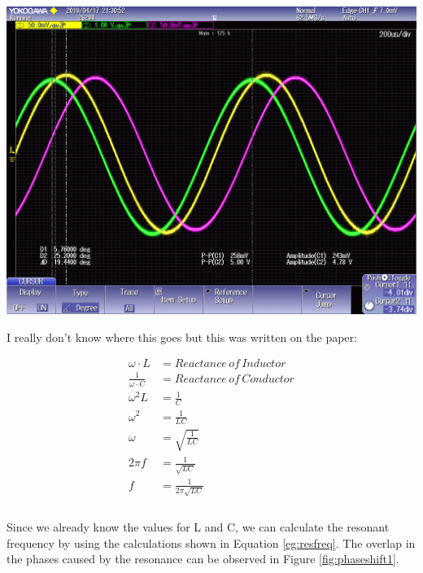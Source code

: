 \documentclass[journal]{IEEEtran}
\begin{document}
\begingroup
    \centering
    \medskip
    \includegraphics[width=\columnwidth]{images/lab8_025.png}
    \label{fig:rlcosc1}
    \medskip
\endgroup


{\color{red}I really don't know where this goes but this was written on the paper:

    \begin{equation}
        \begin{split}
            \omega \cdot L & = Reactance \, of \, Inductor \\
            \frac{1}{\omega \cdot C} & = Reactance\, of\,  Conductor \\ 
            \omega^2 L & = \frac{1}{C}\\
            \omega^2 & = \frac{1}{LC}\\
            \omega & = \sqrt{\frac{1}{LC}}\\
            2 \pi f & = \frac{1}{\sqrt{LC}} \\
            f & = \frac{1}{2 \pi \sqrt{LC}} \\
        \end{split}
        \label{eg:resfreq}
    \end{equation} \\
    
    Since we already know the values for L and C, we can calculate the resonant frequency by using the calculations shown in Equation \ref{eg:resfreq}. The overlap in the phases caused by the resonance can be observed in Figure \ref{fig:phaseshift1}.
}
\end{document}

